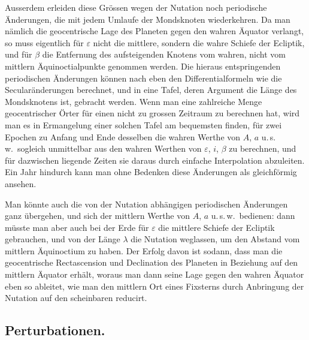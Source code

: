 \documentclass[12pt,a4paper]{article}
\begin{document}
Ausserdem erleiden diese Grössen wegen der Nutation noch periodische
Änderungen, die mit jedem Umlaufe der Mondsknoten wiederkehren. Da man
nämlich die geocentrische Lage des Planeten gegen den wahren Äquator verlangt,
so muss eigentlich für $\varepsilon$ nicht die mittlere, sondern die wahre Schiefe der Ecliptik,
und für $\beta$ die Entfernung des aufsteigenden Knotens vom wahren, nicht vom
mittlern Äquinoctialpunkte genommen werden. Die hieraus entspringenden
periodischen Änderungen können nach eben den Differentialformeln wie die
Secularänderungen berechnet, und in eine Tafel, deren Argument die Länge des
Mondsknotens ist, gebracht werden. Wenn man eine zahlreiche Menge geocentrischer
Örter für einen nicht zu grossen Zeitraum zu berechnen hat, wird man es in
Ermangelung einer solchen Tafel am bequemsten finden, für zwei Epochen zu
Anfang und Ende desselben die wahren Werthe von $A$, $a$ u.\,s.\,w.\ sogleich
unmittelbar aus den wahren Werthen von $\varepsilon$, $i$, $\beta$ zu berechnen, und für dazwischen
liegende Zeiten sie daraus durch einfache Interpolation abzuleiten. Ein Jahr
hindurch kann man ohne Bedenken diese Änderungen als gleichförmig ansehen.

Man könnte auch die von der Nutation abhängigen periodischen Änderungen
ganz übergehen, und sich der mittlern Werthe von $A$, $a$ u.\,s.\,w.\ bedienen:
dann müsste man aber auch bei der Erde für $\varepsilon$ die mittlere Schiefe der Ecliptik
gebrauchen, und von der Länge $\lambda$ die Nutation weglassen, um den Abstand
vom mittlern Äquinoctium zu haben. Der Erfolg davon ist sodann, dass man
die geocentrische Rectascension und Declination des Planeten in Beziehung auf
den mittlern Äquator erhält, woraus man dann seine Lage gegen den wahren
Äquator eben so ableitet, wie man den mittlern Ort eines Fixsterns durch
Anbringung der Nutation auf den scheinbaren reducirt.

\subsection{Perturbationen.}
\end{document}

